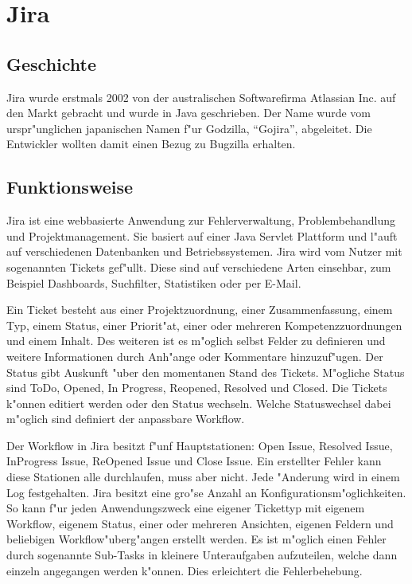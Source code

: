 \section{Jira}
\subsection{Geschichte}
Jira wurde erstmals 2002 von der australischen Softwarefirma Atlassian Inc. auf den Markt gebracht und wurde in Java geschrieben. Der Name wurde vom urspr"unglichen japanischen Namen f"ur Godzilla, ``Gojira'', abgeleitet. Die Entwickler wollten damit einen Bezug zu Bugzilla erhalten.

\subsection{Funktionsweise}
Jira ist eine webbasierte Anwendung zur Fehlerverwaltung, Problembehandlung und Projektmanagement. Sie basiert auf einer Java Servlet Plattform und l"auft auf verschiedenen Datenbanken und Betriebssystemen. Jira wird vom Nutzer mit sogenannten Tickets gef"ullt. Diese sind auf verschiedene Arten einsehbar, zum Beispiel Dashboards, Suchfilter, Statistiken oder per E-Mail.

Ein Ticket besteht aus einer Projektzuordnung, einer Zusammenfassung, einem Typ, einem Status, einer Priorit"at, einer oder mehreren Kompetenzzuordnungen und einem Inhalt. Des weiteren ist es m"oglich selbst Felder zu definieren und weitere Informationen durch Anh"ange oder Kommentare hinzuzuf"ugen. Der Status gibt Auskunft "uber den momentanen Stand des Tickets. M"ogliche Status sind ToDo, Opened, In Progress, Reopened, Resolved und Closed. Die Tickets k"onnen editiert werden oder den Status wechseln. Welche Statuswechsel dabei m"oglich sind definiert der anpassbare Workflow.

Der Workflow in Jira besitzt f"unf Hauptstationen: Open Issue, Resolved Issue, InProgress Issue, ReOpened Issue und Close Issue. Ein erstellter Fehler kann diese Stationen alle durchlaufen, muss aber nicht. 
Jede "Anderung wird in einem Log festgehalten. Jira besitzt eine gro"se Anzahl an Konfigurationsm"oglichkeiten. So kann f"ur jeden Anwendungszweck eine eigener Tickettyp mit eigenem Workflow, eigenem Status, einer oder mehreren Ansichten, eigenen Feldern und beliebigen Workflow"uberg"angen erstellt werden.
Es ist m"oglich einen Fehler durch sogenannte Sub-Tasks in kleinere Unteraufgaben aufzuteilen, welche dann einzeln angegangen werden k"onnen. Dies erleichtert die Fehlerbehebung.

